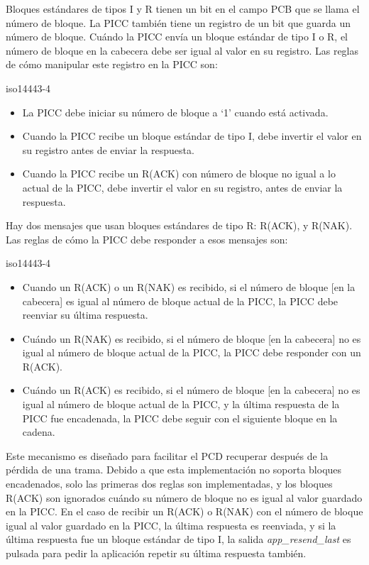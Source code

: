 \documentclass[a4paper, twoside, 11pt]{report}
\begin{document}
Bloques estándares de tipos I y R tienen un bit en el campo PCB que se llama el número de bloque. La PICC también tiene un registro de un bit que guarda un número de bloque. Cuándo la PICC envía un bloque estándar de tipo I o R, el número de bloque en la cabecera debe ser igual al valor en su registro. Las reglas de cómo manipular este registro en la PICC son:

\begin{displaycquote}{iso14443-4}
  \begin{itemize}
    \item La PICC debe iniciar su número de bloque a ‘1’ cuando está activada.
    \item Cuando la PICC recibe un bloque estándar de tipo I, debe invertir el valor en su registro antes de enviar la respuesta.
    \item Cuando la PICC recibe un R(ACK) con número de bloque no igual a lo actual de la PICC, debe invertir el valor en su registro, antes de enviar la respuesta.
  \end{itemize}
\end{displaycquote}

Hay dos mensajes que usan bloques estándares de tipo R: R(ACK), y R(NAK). Las reglas de cómo la PICC debe responder a esos mensajes son:

\begin{displaycquote}{iso14443-4}
  \begin{itemize}
    \item Cuando un R(ACK) o un R(NAK) es recibido, si el número de bloque [en la cabecera] es igual al número de bloque actual de la PICC, la PICC debe reenviar su última respuesta.
    \item Cuándo un R(NAK) es recibido, si el número de bloque [en la cabecera] no es igual al número de bloque actual de la PICC, la PICC debe responder con un R(ACK).
    \item Cuándo un R(ACK) es recibido, si el número de bloque [en la cabecera] no es igual al número de bloque actual de la PICC, y la última respuesta de la PICC fue encadenada, la PICC debe seguir con el siguiente bloque en la cadena.
  \end{itemize}
\end{displaycquote}

Este mecanismo es diseñado para facilitar el PCD recuperar después de la pérdida de una trama. Debido a que esta implementación no soporta bloques encadenados, solo las primeras dos reglas son implementadas, y los bloques R(ACK) son ignorados cuándo su número de bloque no es igual al valor guardado en la PICC. En el caso de recibir un R(ACK) o R(NAK) con el número de bloque igual al valor guardado en la PICC, la última respuesta es reenviada, y si la última respuesta fue un bloque estándar de tipo I, la salida \textit{app\_resend\_last} es pulsada para pedir la aplicación repetir su última respuesta también.
\end{document}
